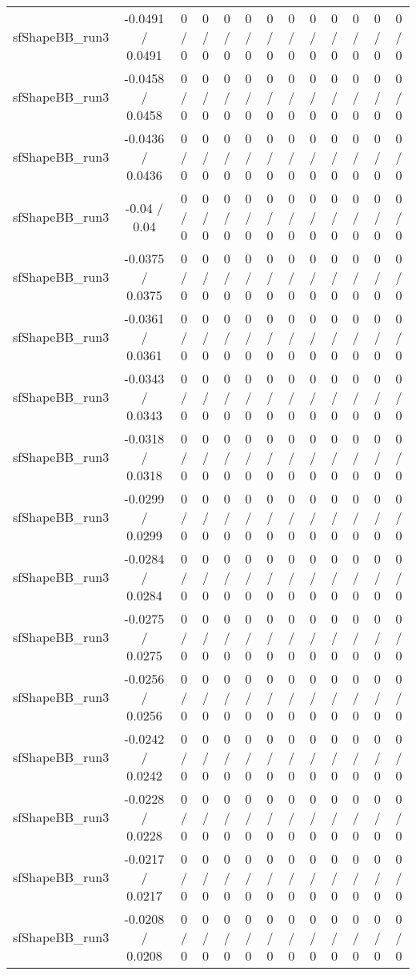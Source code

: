 \documentclass[10pt]{article}
\begin{document}
\begin{table}[htbp]
\begin{center}
\begin{tabular}{|c|c|c|c|c|c|c|c|c|c|c|c|c|}
  sfShapeBB_run3 & -0.0491 / 0.0491 & 0 / 0 & 0 / 0 & 0 / 0 & 0 / 0 & 0 / 0 & 0 / 0 & 0 / 0 & 0 / 0 & 0 / 0 & 0 / 0 & 0 / 0 \\ 
  sfShapeBB_run3 & -0.0458 / 0.0458 & 0 / 0 & 0 / 0 & 0 / 0 & 0 / 0 & 0 / 0 & 0 / 0 & 0 / 0 & 0 / 0 & 0 / 0 & 0 / 0 & 0 / 0 \\ 
  sfShapeBB_run3 & -0.0436 / 0.0436 & 0 / 0 & 0 / 0 & 0 / 0 & 0 / 0 & 0 / 0 & 0 / 0 & 0 / 0 & 0 / 0 & 0 / 0 & 0 / 0 & 0 / 0 \\ 
  sfShapeBB_run3 & -0.04 / 0.04 & 0 / 0 & 0 / 0 & 0 / 0 & 0 / 0 & 0 / 0 & 0 / 0 & 0 / 0 & 0 / 0 & 0 / 0 & 0 / 0 & 0 / 0 \\ 
  sfShapeBB_run3 & -0.0375 / 0.0375 & 0 / 0 & 0 / 0 & 0 / 0 & 0 / 0 & 0 / 0 & 0 / 0 & 0 / 0 & 0 / 0 & 0 / 0 & 0 / 0 & 0 / 0 \\ 
  sfShapeBB_run3 & -0.0361 / 0.0361 & 0 / 0 & 0 / 0 & 0 / 0 & 0 / 0 & 0 / 0 & 0 / 0 & 0 / 0 & 0 / 0 & 0 / 0 & 0 / 0 & 0 / 0 \\ 
  sfShapeBB_run3 & -0.0343 / 0.0343 & 0 / 0 & 0 / 0 & 0 / 0 & 0 / 0 & 0 / 0 & 0 / 0 & 0 / 0 & 0 / 0 & 0 / 0 & 0 / 0 & 0 / 0 \\ 
  sfShapeBB_run3 & -0.0318 / 0.0318 & 0 / 0 & 0 / 0 & 0 / 0 & 0 / 0 & 0 / 0 & 0 / 0 & 0 / 0 & 0 / 0 & 0 / 0 & 0 / 0 & 0 / 0 \\ 
  sfShapeBB_run3 & -0.0299 / 0.0299 & 0 / 0 & 0 / 0 & 0 / 0 & 0 / 0 & 0 / 0 & 0 / 0 & 0 / 0 & 0 / 0 & 0 / 0 & 0 / 0 & 0 / 0 \\ 
  sfShapeBB_run3 & -0.0284 / 0.0284 & 0 / 0 & 0 / 0 & 0 / 0 & 0 / 0 & 0 / 0 & 0 / 0 & 0 / 0 & 0 / 0 & 0 / 0 & 0 / 0 & 0 / 0 \\ 
  sfShapeBB_run3 & -0.0275 / 0.0275 & 0 / 0 & 0 / 0 & 0 / 0 & 0 / 0 & 0 / 0 & 0 / 0 & 0 / 0 & 0 / 0 & 0 / 0 & 0 / 0 & 0 / 0 \\ 
  sfShapeBB_run3 & -0.0256 / 0.0256 & 0 / 0 & 0 / 0 & 0 / 0 & 0 / 0 & 0 / 0 & 0 / 0 & 0 / 0 & 0 / 0 & 0 / 0 & 0 / 0 & 0 / 0 \\ 
  sfShapeBB_run3 & -0.0242 / 0.0242 & 0 / 0 & 0 / 0 & 0 / 0 & 0 / 0 & 0 / 0 & 0 / 0 & 0 / 0 & 0 / 0 & 0 / 0 & 0 / 0 & 0 / 0 \\ 
  sfShapeBB_run3 & -0.0228 / 0.0228 & 0 / 0 & 0 / 0 & 0 / 0 & 0 / 0 & 0 / 0 & 0 / 0 & 0 / 0 & 0 / 0 & 0 / 0 & 0 / 0 & 0 / 0 \\ 
  sfShapeBB_run3 & -0.0217 / 0.0217 & 0 / 0 & 0 / 0 & 0 / 0 & 0 / 0 & 0 / 0 & 0 / 0 & 0 / 0 & 0 / 0 & 0 / 0 & 0 / 0 & 0 / 0 \\ 
  sfShapeBB_run3 & -0.0208 / 0.0208 & 0 / 0 & 0 / 0 & 0 / 0 & 0 / 0 & 0 / 0 & 0 / 0 & 0 / 0 & 0 / 0 & 0 / 0 & 0 / 0 & 0 / 0 \\ 

\end{tabular}
\end{center}
\end{table}
\end{document}
